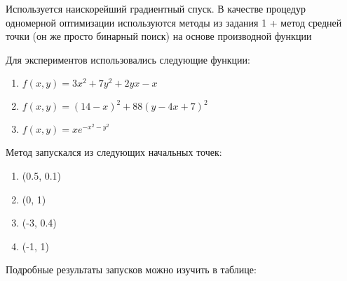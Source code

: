 \documentclass{article}
\providecommand{\tightlist}{%
      \setlength{\itemsep}{0pt}\setlength{\parskip}{0pt}}
\newcommand{\prompt}[4]{
        {\ttfamily\llap{{\color{#2}[#3]:\hspace{3pt}#4}}\vspace{-\baselineskip}}
    }
\begin{document}
    Используется наискорейший градиентный спуск. В качестве процедур
одномерной оптимизации используются методы из задания 1 + метод средней
точки (он же просто бинарный поиск) на основе производной функции

Для экспериментов использовались следующие функции:

\begin{enumerate}
\def\labelenumi{\arabic{enumi}.}
\setcounter{enumi}{-1}
\tightlist
\item
  \(f(x, y) = 3x^2+7y^2+2yx-x\)
\item
  \(f(x, y) = (14-x)^2+88(y - 4x + 7)^2\)
\item
  \(f(x, y) = xe^{-x^2-y^2}\)
\end{enumerate}

Метод запускался из следующих начальных точек:

\begin{enumerate}
\def\labelenumi{\arabic{enumi}.}
\setcounter{enumi}{-1}
\tightlist
\item
  (0.5, 0.1)
\item
  (0, 1)
\item
  (-3, 0.4)
\item
  (-1, 1)
\end{enumerate}

Подробные результаты запусков можно изучить в таблице:
 
            
\prompt{Out}{outcolor}{7}{}
    
\end{document}
